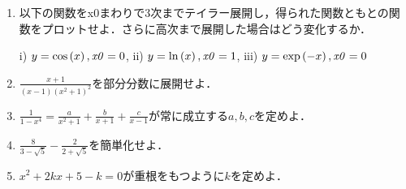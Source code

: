 \begin{enumerate}
\item 以下の関数をx0まわりで3次までテイラー展開し，得られた関数ともとの関数をプロットせよ．さらに高次まで展開した場合はどう変化するか．

i) $y =\cos \left(x \right),{\it x0} =0$, ii) $y =\ln\left(x \right),{\it x0} =1$, iii) $y =\exp \left(-x \right),{\it x0} =0$
\item $\displaystyle \frac{x+1}{(x-1)(x^2+1)^2}$を部分分数に展開せよ．
\item $\displaystyle \frac{1}{1-x^4} = \frac{a}{x^2+1}+\frac{b}{x+1}+\frac{c}{x-1}$が常に成立する$a, b, c$を定めよ．
\item $\displaystyle \frac{8}{3-\sqrt{5}}-\frac{2}{2+\sqrt{5}}$を簡単化せよ．
\item $\displaystyle x^2+2kx+5-k=0$が重根をもつように$k$を定めよ．
\end{enumerate}
